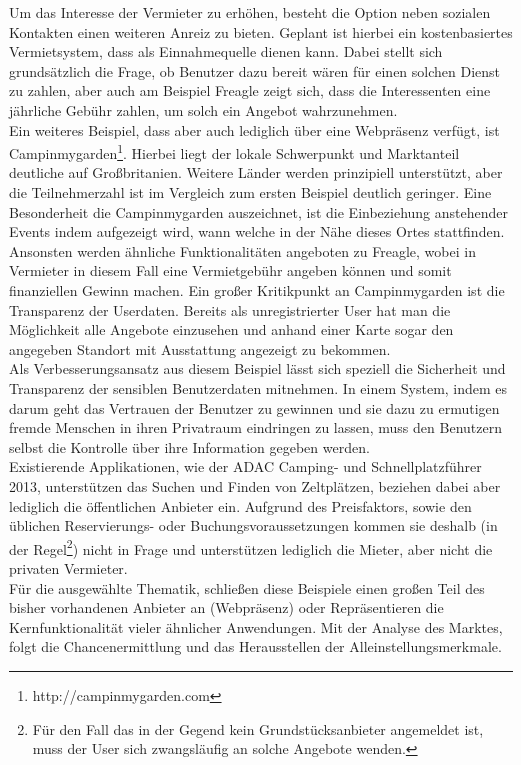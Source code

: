     Um das Interesse der Vermieter zu erhöhen, besteht die Option neben sozialen Kontakten einen weiteren Anreiz zu bieten. Geplant ist hierbei ein kostenbasiertes Vermietsystem, dass als Einnahmequelle dienen kann. Dabei stellt sich grundsätzlich die Frage, ob Benutzer dazu bereit wären für einen solchen Dienst zu zahlen, aber auch am Beispiel Freagle zeigt sich, dass die Interessenten eine jährliche Gebühr zahlen, um solch ein Angebot wahrzunehmen.\\
    
    Ein weiteres Beispiel, dass aber auch lediglich über eine Webpräsenz verfügt, ist \\  Campinmygarden\footnote{http://campinmygarden.com}. Hierbei liegt der lokale Schwerpunkt und Marktanteil deutliche auf Großbritanien. Weitere Länder werden prinzipiell unterstützt, aber die Teilnehmerzahl ist im Vergleich zum ersten Beispiel deutlich geringer.
    Eine Besonderheit die Campinmygarden auszeichnet, ist die Einbeziehung anstehender Events indem aufgezeigt wird, wann welche in der Nähe dieses Ortes stattfinden. Ansonsten werden ähnliche Funktionalitäten angeboten zu Freagle, wobei in Vermieter in diesem Fall eine Vermietgebühr angeben können und somit finanziellen Gewinn machen. Ein großer Kritikpunkt an Campinmygarden ist die Transparenz der Userdaten. Bereits als unregistrierter User hat man die Möglichkeit alle Angebote einzusehen und anhand einer Karte sogar den angegeben Standort mit Ausstattung angezeigt zu bekommen.\\
    Als Verbesserungsansatz aus diesem Beispiel lässt sich speziell die Sicherheit und Transparenz der sensiblen Benutzerdaten mitnehmen. 
    In einem System, indem es darum geht das Vertrauen der Benutzer zu gewinnen und sie dazu zu ermutigen fremde Menschen in ihren Privatraum eindringen zu lassen, muss den Benutzern selbst die Kontrolle über ihre Information gegeben werden.\\

    Existierende Applikationen, wie der ADAC Camping- und Schnellplatzführer 2013, unterstützen das Suchen und Finden von Zeltplätzen, beziehen dabei aber lediglich die öffentlichen Anbieter ein. Aufgrund des Preisfaktors, sowie den üblichen Reservierungs- oder Buchungsvoraussetzungen kommen sie deshalb (in der Regel\footnote{Für den Fall das in der Gegend kein Grundstücksanbieter angemeldet ist, muss der User sich zwangsläufig an solche Angebote wenden. }) nicht in Frage und unterstützen lediglich die Mieter, aber nicht die privaten Vermieter.\\

    Für die ausgewählte Thematik, schließen diese Beispiele einen großen Teil des bisher vorhandenen Anbieter an (Webpräsenz) oder Repräsentieren die Kernfunktionalität vieler ähnlicher Anwendungen. 
    Mit der Analyse des Marktes, folgt die Chancenermittlung und das Herausstellen der Alleinstellungsmerkmale.

